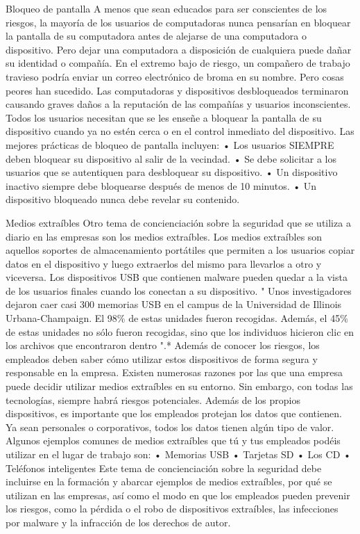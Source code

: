\documentclass[
]{article}
\begin{document}
Bloqueo de pantalla
A menos que sean educados para ser conscientes de los riesgos, la mayoría de los usuarios de computadoras nunca pensarían en bloquear la pantalla de su computadora antes de alejarse de una computadora o dispositivo. Pero dejar una computadora a disposición de cualquiera puede dañar su identidad o compañía. En el extremo bajo de riesgo, un compañero de trabajo travieso podría enviar un correo electrónico de broma en su nombre. Pero cosas peores han sucedido. Las computadoras y dispositivos desbloqueados terminaron causando graves daños a la reputación de las compañías y usuarios inconscientes.
Todos los usuarios necesitan que se les enseñe a bloquear la pantalla de su dispositivo cuando ya no estén cerca o en el control inmediato del dispositivo.
Las mejores prácticas de bloqueo de pantalla incluyen:
• Los usuarios SIEMPRE deben bloquear su dispositivo al salir de la vecindad.
• Se debe solicitar a los usuarios que se autentiquen para desbloquear su dispositivo.
• Un dispositivo inactivo siempre debe bloquearse después de menos de 10 minutos.
• Un dispositivo bloqueado nunca debe revelar su contenido.

Medios extraíbles
Otro tema de concienciación sobre la seguridad que se utiliza a diario en las empresas son los medios extraíbles. Los medios extraíbles son aquellos soportes de almacenamiento portátiles que permiten a los usuarios copiar datos en el dispositivo y luego extraerlos del mismo para llevarlos a otro y viceversa. Los dispositivos USB que contienen malware pueden quedar a la vista de los usuarios finales cuando los conectan a su dispositivo.
" Unos investigadores dejaron caer casi 300 memorias USB en el campus de la Universidad de Illinois Urbana-Champaign. El 98\% de estas unidades fueron recogidas. Además, el 45\% de estas unidades no sólo fueron recogidas, sino que los individuos hicieron clic en los archivos que encontraron dentro ".*
Además de conocer los riesgos, los empleados deben saber cómo utilizar estos dispositivos de forma segura y responsable en la empresa. Existen numerosas razones por las que una empresa puede decidir utilizar medios extraíbles en su entorno. Sin embargo, con todas las tecnologías, siempre habrá riesgos potenciales. Además de los propios dispositivos, es importante que los empleados protejan los datos que contienen. Ya sean personales o corporativos, todos los datos tienen algún tipo de valor.
Algunos ejemplos comunes de medios extraíbles que tú y tus empleados podéis utilizar en el lugar de trabajo son:
• Memorias USB
• Tarjetas SD
• Los CD
• Teléfonos inteligentes
Este tema de concienciación sobre la seguridad debe incluirse en la formación y abarcar ejemplos de medios extraíbles, por qué se utilizan en las empresas, así como el modo en que los empleados pueden prevenir los riesgos, como la pérdida o el robo de dispositivos extraíbles, las infecciones por malware y la infracción de los derechos de autor.
\end{document}
